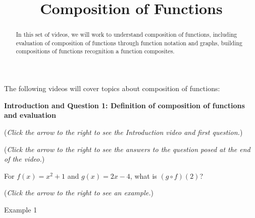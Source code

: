 \documentclass{ximera}
\title[Prerequisite Videos: ]{Composition of Functions}
\begin{document}
\begin{abstract}
  In this set of videos, we will work to understand
  composition of functions, including evaluation 
  of composition of functions through function 
  notation and graphs, building compositions of functions
  recognition a function composites.
\end{abstract}
\maketitle

The following videos will cover topics about composition of functions:

\textbf{Introduction and Question 1: Definition 
  of composition of functions and  evaluation}
\begin{question}
\begin{flushright}
{\color{blue}(\emph{Click the arrow to the right to see the Introduction video and first question.})}
\end{flushright}
\begin{center}
\begin{expandable}
{\color{blue}(\emph{Click the arrow to the right to see the answers 
to the question posed at the end of the video.})}
\begin{expandable}
For $f(x) = x^2 + 1$ and $g(x) =2x-4$, what is $(g \circ f)(2)$?
\begin{multipleChoice}
\end{multipleChoice}
\begin{flushright}
{\color{blue}(\emph{Click the arrow to the right to see an example.})}
\end{flushright}
\begin{expandable}
Example 1
\end{expandable}
\end{expandable}
\end{expandable}
\end{center}
\end{question}
\end{document}
